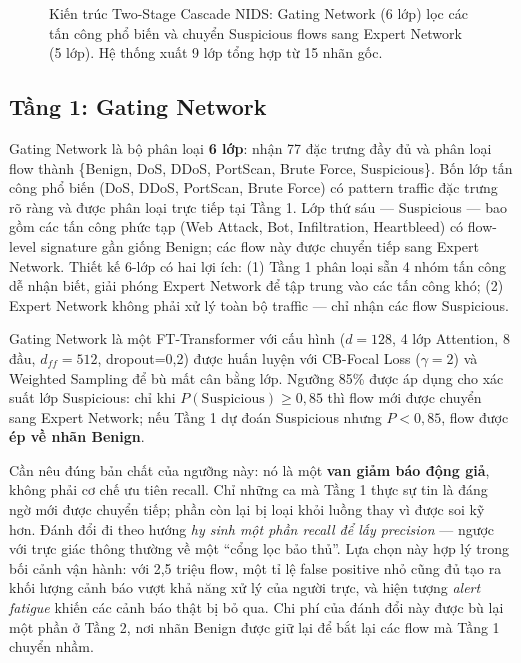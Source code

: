 \documentclass[../DoAn.tex]{subfiles}
\begin{document}
\begin{figure}[H]
{%
}
\caption{Kiến trúc Two-Stage Cascade NIDS: Gating Network (6 lớp) lọc các tấn công phổ biến và chuyển Suspicious flows sang Expert Network (5 lớp). Hệ thống xuất 9 lớp tổng hợp từ 15 nhãn gốc.}
\label{fig:two-stage-arch}
\end{figure}

\subsection{Tầng 1: Gating Network}
\label{subsec:gd2-stage1}

Gating Network là bộ phân loại \textbf{6 lớp}: nhận 77 đặc trưng đầy đủ và phân loại flow thành \{Benign, DoS, DDoS, PortScan, Brute Force, Suspicious\}. Bốn lớp tấn công phổ biến (DoS, DDoS, PortScan, Brute Force) có pattern traffic đặc trưng rõ ràng và được phân loại trực tiếp tại Tầng 1. Lớp thứ sáu --- Suspicious --- bao gồm các tấn công phức tạp (Web Attack, Bot, Infiltration, Heartbleed) có flow-level signature gần giống Benign; các flow này được chuyển tiếp sang Expert Network. Thiết kế 6-lớp có hai lợi ích: (1) Tầng 1 phân loại sẵn 4 nhóm tấn công dễ nhận biết, giải phóng Expert Network để tập trung vào các tấn công khó; (2) Expert Network không phải xử lý toàn bộ traffic --- chỉ nhận các flow Suspicious.

Gating Network là một FT-Transformer với cấu hình ($d=128$, 4 lớp Attention, 8 đầu, $d_{ff}=512$, dropout=0,2) được huấn luyện với CB-Focal Loss ($\gamma=2$) và Weighted Sampling để bù mất cân bằng lớp. Ngưỡng 85\% được áp dụng cho xác suất lớp Suspicious: chỉ khi $P(\text{Suspicious}) \geq 0{,}85$ thì flow mới được chuyển sang Expert Network; nếu Tầng 1 dự đoán Suspicious nhưng $P < 0{,}85$, flow được \textbf{ép về nhãn Benign}.

Cần nêu đúng bản chất của ngưỡng này: nó là một \textbf{van giảm báo động giả}, không phải cơ chế ưu tiên recall. Chỉ những ca mà Tầng 1 thực sự tin là đáng ngờ mới được chuyển tiếp; phần còn lại bị loại khỏi luồng thay vì được soi kỹ hơn. Đánh đổi đi theo hướng \textit{hy sinh một phần recall để lấy precision} --- ngược với trực giác thông thường về một ``cổng lọc bảo thủ''. Lựa chọn này hợp lý trong bối cảnh vận hành: với 2,5 triệu flow, một tỉ lệ false positive nhỏ cũng đủ tạo ra khối lượng cảnh báo vượt khả năng xử lý của người trực, và hiện tượng \textit{alert fatigue} khiến các cảnh báo thật bị bỏ qua. Chi phí của đánh đổi này được bù lại một phần ở Tầng 2, nơi nhãn Benign được giữ lại để bắt lại các flow mà Tầng 1 chuyển nhầm.
\end{document}
